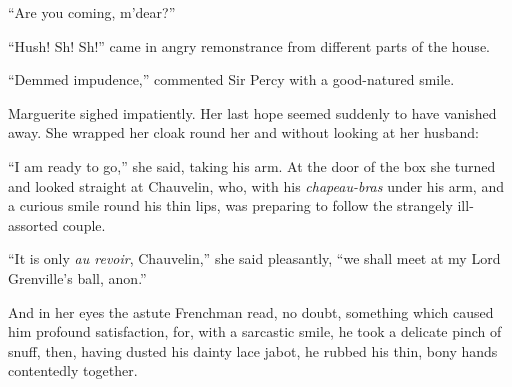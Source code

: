 \enquote{Are you coming, m'dear?}

\enquote{Hush! Sh! Sh!} came in angry remonstrance from different parts of the house.

\enquote{Demmed impudence,} commented Sir Percy with a good-natured smile.

Marguerite sighed impatiently. Her last hope seemed suddenly to have vanished away. She wrapped her cloak round her and without looking at her husband:

\enquote{I am ready to go,} she said, taking his arm. At the door of the box she turned and looked straight at Chauvelin, who, with his \textit{chapeau-bras} under his arm, and a curious smile round his thin lips, was preparing to follow the strangely ill-assorted couple.

\enquote{It is only \textit{au revoir}, Chauvelin,} she said pleasantly, \enquote{we shall meet at my Lord Grenville's ball, anon.}

And in her eyes the astute Frenchman read, no doubt, something which caused him profound satisfaction, for, with a sarcastic smile, he took a delicate pinch of snuff, then, having dusted his dainty lace jabot, he rubbed his thin, bony hands contentedly together.